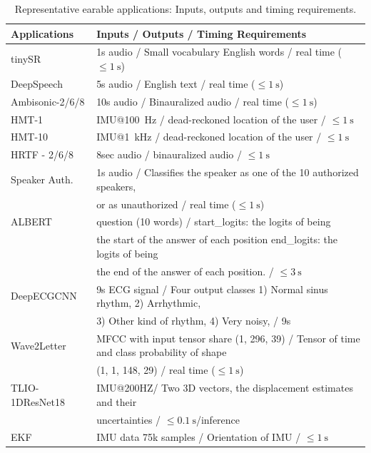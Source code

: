 \begin{table}[]
\centering
\label{tab:earbench_metrics}
\caption{Representative earable applications: Inputs, outputs and timing requirements.}
\tiny
\begin{tabular}{ll}
\toprule
Applications    & Inputs / Outputs / Timing Requirements  \\ \midrule
tinySR          & 1s audio /
Small vocabulary English words
/ real time ($\leq \SI{1}{\second}$)   \\
DeepSpeech      & 5s audio /
English text
/ real time ($\leq \SI{1}{\second}$)   \\
Ambisonic-2/6/8     & 10s audio /
Binauralized audio
/ real time ($\leq \SI{1}{\second}$)   \\
HMT-1           & IMU@\SI{100}{\hertz} /
dead-reckoned location of the user
/  $\leq \SI{1}{\second}$             \\
HMT-10          & IMU@\SI{1}{\kilo\hertz} /
dead-reckoned location of the user
/ $\leq \SI{1}{\second}$               \\
HRTF - 2/6/8    &  8sec audio / binauralized audio /   $\leq \SI{1}{\second}$ \\
Speaker Auth.   & 1s audio /
Classifies the speaker as one of the 10 authorized speakers,\\
& or as unauthorized
/ real time ($\leq \SI{1}{\second}$)    \\
ALBERT          & question (10 words) /
start\_logits: the logits of being \\
& the start of the answer of each position
end\_logits: the logits of being \\
& the end of the answer of each position.
/  $\leq \SI{3}{\second}$\\
DeepECGCNN      & 9s ECG signal  /
Four output classes 1) Normal sinus rhythm, 2) Arrhythmic, \\
& 3) Other kind
of rhythm,
4) Very noisy,
/ 9s                    \\
Wave2Letter     &  MFCC with input tensor share (1, 296, 39)
/ Tensor of time and class probability of shape \\
& (1, 1, 148, 29)
/ real time ($\leq \SI{1}{\second}$)  \\
TLIO-1DResNet18 & IMU@200HZ/
Two 3D vectors, the displacement estimates and their \\
& uncertainties
/ $\leq \SI{0.1}{\second}$/inference \\
EKF & IMU data 75k samples / Orientation of IMU /  $\leq \SI{1}{\second}$\\
\bottomrule
\end{tabular}
\end{table}


